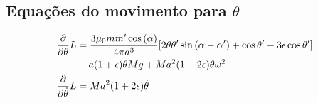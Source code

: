 \documentclass[a4paper, 12pt]{article}
\begin{document}
\subsection{Equações do movimento para $\theta$}

\begin{align}
    \pdv{}{\theta}L&=\frac{3\mu_0mm'\cos\qty(\alpha)}{4\pi a^3}\qty[2\theta\theta'\sin\qty(\alpha-\alpha')+\cos\theta'-3\epsilon\cos\theta']\nonumber\\
    &-a\qty(1+\epsilon)\theta Mg+Ma^2\qty(1+2\epsilon)\theta\omega^2\nonumber\\
    \pdv{}{\dot{\theta}}L&=Ma^2\qty(1+2\epsilon)\dot{\theta}\nonumber
\end{align}
\end{document}
